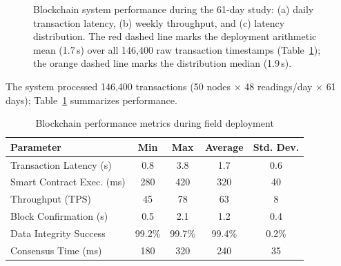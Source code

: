 \documentclass[pdflatex,sn-mathphys-num]{sn-jnl}
\theoremstyle{thmstyleone}
\theoremstyle{thmstyletwo}
\theoremstyle{thmstylethree}
\begin{document}
\begin{figure}[!htbp]
\begin{subfigure}[b]{0.45\linewidth}
\label{subfig:distribution}
\label{fig:latency_distribution}
\end{subfigure}
\caption{Blockchain system performance during the 61-day study: (a) daily transaction latency, (b) weekly throughput, and (c) latency distribution. The red dashed line marks the deployment arithmetic mean (1.7\,s) over all 146,400 raw transaction timestamps (Table~\ref{tab:blockchain_detailed}); the orange dashed line marks the distribution median (1.9\,s).}
\label{fig:blockchain_performance_2025}
\end{figure}

The system processed 146,400 transactions (50 nodes × 48 readings/day × 61 days); Table~\ref{tab:blockchain_detailed} summarizes performance.

\begin{table}[htbp]
\centering
\caption{Blockchain performance metrics during field deployment}
\label{tab:blockchain_detailed}
\footnotesize
\setlength{\tabcolsep}{3.5pt}
\begin{tabular}{lcccc}
\toprule
\textbf{Parameter} & \textbf{Min} & \textbf{Max} & \textbf{Average} & \textbf{Std. Dev.} \\
\midrule
Transaction Latency (s) & 0.8 & 3.8 & 1.7 & 0.6 \\
Smart Contract Exec. (ms) & 280 & 420 & 320 & 40 \\
Throughput (TPS) & 45 & 78 & 63 & 8 \\
Block Confirmation (s) & 0.5 & 2.1 & 1.2 & 0.4 \\
Data Integrity Success & 99.2\% & 99.7\% & 99.4\% & 0.2\% \\
Consensus Time (ms) & 180 & 320 & 240 & 35 \\
\bottomrule
\end{tabular}
\end{table}
\end{document}
